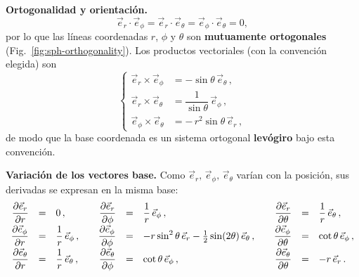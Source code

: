 \documentclass[../apunte_mecanica_clasica.tex]{subfiles}%
\begin{document}
\begin{apuntebloque}{}

\noindent \textbf{Ortogonalidad y orientación.}
\begin{equation*}
\vec{e}_r\cdot\vec{e}_\phi=\vec{e}_r\cdot\vec{e}_\theta=\vec{e}_\phi\cdot\vec{e}_\theta=0,
\end{equation*}
por lo que las líneas coordenadas $r$, $\phi$ y $\theta$ son \textbf{mutuamente ortogonales} (Fig.~\ref{fig:sph-orthogonality}). Los productos vectoriales (con la convención elegida) son
\begin{equation*}
\left\{
\begin{aligned}
\vec{e}_r\times\vec{e}_\phi&=-\sin\theta\,\vec{e}_\theta\,,\\[4pt]
\vec{e}_r\times\vec{e}_\theta&=\dfrac{1}{\sin\theta}\,\vec{e}_\phi\,,\\[4pt]
\vec{e}_\phi\times\vec{e}_\theta&=-\,r^{2}\sin\theta\,\vec{e}_r\,,
\end{aligned}
\right.
\end{equation*}
de modo que la base coordenada es un sistema ortogonal \textbf{levógiro} bajo esta convención.

\medskip
\noindent \textbf{Variación de los vectores base.} Como $\vec{e}_r,\,\vec{e}_\phi,\,\vec{e}_\theta$ varían con la posición, sus derivadas se expresan en la misma base:
\begin{equation*}
\setlength{\jot}{4pt}
\begin{array}{rcl @{\qquad} rcl @{\qquad} rcl}
\displaystyle \frac{\partial \vec{e}_r}{\partial r} & = & 0 \,,
& \displaystyle \frac{\partial \vec{e}_r}{\partial \phi} & = & \displaystyle \frac{1}{r}\,\vec{e}_\phi \,,
& \displaystyle \frac{\partial \vec{e}_r}{\partial \theta} & = & \displaystyle \frac{1}{r}\,\vec{e}_\theta \,, \\[6pt]
\displaystyle \frac{\partial \vec{e}_\phi}{\partial r} & = & \displaystyle \frac{1}{r}\,\vec{e}_\phi \,,
& \displaystyle \frac{\partial \vec{e}_\phi}{\partial \phi} & = & \displaystyle -r \sin^2\theta\,\vec{e}_r - \tfrac{1}{2}\sin(2\theta)\,\vec{e}_\theta \,,
& \displaystyle \frac{\partial \vec{e}_\phi}{\partial \theta} & = & \displaystyle \cot\theta\,\vec{e}_\phi \,,\\[6pt]
\displaystyle \frac{\partial \vec{e}_\theta}{\partial r} & = & \displaystyle \frac{1}{r}\,\vec{e}_\theta \,,
& \displaystyle \frac{\partial \vec{e}_\theta}{\partial \phi} & = & \displaystyle \cot\theta\,\vec{e}_\phi \,,
& \displaystyle \frac{\partial \vec{e}_\theta}{\partial \theta} & = & \displaystyle -r\,\vec{e}_r \,.
\end{array}
\end{equation*}
\end{apuntebloque}
\end{document}

